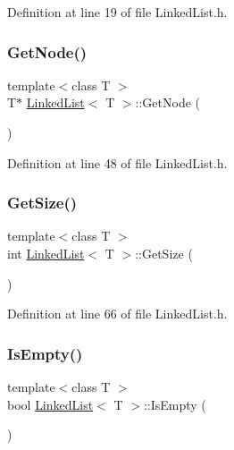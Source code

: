 Definition at line 19 of file Linked\+List.\+h.

\mbox{\label{class_linked_list_a94a6f58f1b437c08d398c3c5d6b038e1}} 
\subsubsection{\texorpdfstring{Get\+Node()}{GetNode()}}
{\footnotesize\ttfamily template$<$class T $>$ \\
T$\ast$ \hyperlink{class_linked_list}{Linked\+List}$<$ T $>$\+::Get\+Node (\begin{DoxyParamCaption}{ }\end{DoxyParamCaption})\hspace{0.3cm}{\ttfamily [inline]}}



Definition at line 48 of file Linked\+List.\+h.

\mbox{\label{class_linked_list_a2ec266fa30f649a81f930eff858a030f}} 
\subsubsection{\texorpdfstring{Get\+Size()}{GetSize()}}
{\footnotesize\ttfamily template$<$class T $>$ \\
int \hyperlink{class_linked_list}{Linked\+List}$<$ T $>$\+::Get\+Size (\begin{DoxyParamCaption}{ }\end{DoxyParamCaption})\hspace{0.3cm}{\ttfamily [inline]}}



Definition at line 66 of file Linked\+List.\+h.

\mbox{\label{class_linked_list_ac5a0d903d22d1157e98b6d3c182e1c74}} 
\subsubsection{\texorpdfstring{Is\+Empty()}{IsEmpty()}}
{\footnotesize\ttfamily template$<$class T $>$ \\
bool \hyperlink{class_linked_list}{Linked\+List}$<$ T $>$\+::Is\+Empty (\begin{DoxyParamCaption}{ }\end{DoxyParamCaption})\hspace{0.3cm}{\ttfamily [inline]}}



